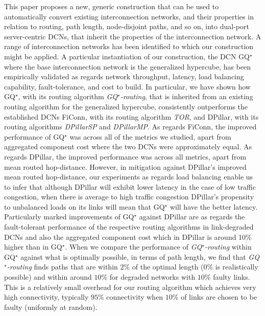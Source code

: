 \documentclass[]{amsart}
\begin{document}
{This paper proposes a new, generic construction that can be used to automatically convert existing interconnection networks, and their properties in relation to routing, path length, node-disjoint paths, and so on, into dual-port server-centric DCNs, that inherit the properties of the interconnection network. A range of interconnection networks has been identified to which our construction might be applied. A particular instantiation of our construction, the DCN GQ$^\star$ where the base interconnection network is the generalized hypercube, has been empirically validated as regards network throughput, latency, load balancing capability, fault-tolerance, and cost to build. In particular, we have shown how GQ$^\star$, with its routing algorithm \emph{GQ$^\star$-routing\/}, that is inherited from an existing routing algorithm for the generalized hypercube, consistently outperforms the established DCNs FiConn, with its routing algorithm \emph{TOR\/}, and DPillar, with its routing algorithms \emph{DPillarSP\/} and \emph{DPillarMP\/}. As regards FiConn, the improved performance of GQ$^\star$ was across all of the metrics we studied, apart from aggregated component cost where the two DCNs were approximately equal. As regards DPillar, the improved performance was across all metrics, apart from mean routed hop-distance. However, in mitigation against DPillar's improved mean routed hop-distance, our experiments as regards load balancing enable us to infer that although DPillar will exhibit lower latency in the case of low traffic congestion, when there is average to high traffic congestion DPillar's propensity to unbalanced loads on its links will mean that GQ$^\star$ will have the better latency. Particularly marked improvements of GQ$^\star$ against DPillar are as regards the fault-tolerant performance of the respective routing algorithms in link-degraded DCNs and also the aggregated component cost which in DPillar is around 10\% higher than in GQ$^\star$. When we compare the performance of \emph{GQ$^\star$-routing\/} within GQ$^\star$ against what is optimally possible, in terms of path length, we find that \emph{GQ$^\star$-routing\/} finds
paths that are within $2\%$ of the optimal length ($0\%$ is
realistically possible) and within around $10\%$ for degraded networks with $10\%$ faulty links.  This is a relatively small overhead for our
routing algorithm which achieves very high connectivity, typically
$95\%$ connectivity when $10\%$ of links are chosen to be faulty (uniformly at random).

\begin{figure}[t]
  \centering
\newcommand{\fillopacityxyz}{1}


\end{figure}}
\end{document}
